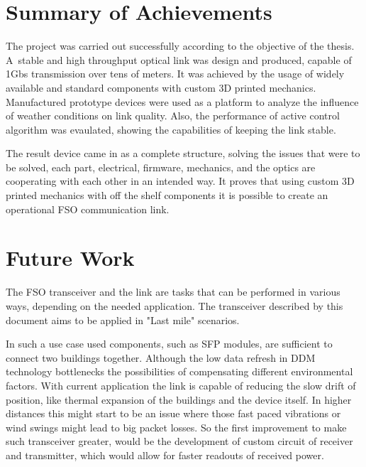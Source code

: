 \documentclass[master,oneside,en,oldtitlepage]{dyplompwr}
\begin{document}
\section{Summary of Achievements}
The project was carried out successfully according to the objective of the thesis. 
A~stable and high throughput optical link was design and produced, capable of 1Gbs transmission over tens of meters.
It was achieved by the usage of widely available and standard components with custom 3D printed mechanics.
Manufactured prototype devices were used as a platform to analyze the influence of weather conditions on link quality.
Also, the performance of active control algorithm was evaulated, showing the capabilities of keeping the link stable.

The result device came in as a complete structure, solving the issues that were to be solved, each part, electrical, firmware, mechanics, and the optics are cooperating with each other in an intended way. It proves that using custom 3D printed mechanics with off the shelf components it is possible to create an operational FSO communication link.

\section{Future Work}

The FSO transceiver and the link are tasks that can be performed in various ways, depending on the needed application.
The transceiver described by this document aims to be applied in "Last mile" scenarios.

In such a use case used components, such as SFP modules, are sufficient to connect two buildings together. 
Although the low data refresh in DDM technology bottlenecks the possibilities of compensating different environmental factors.
With current application the link is capable of reducing the slow drift of position, like thermal expansion of the buildings and the device itself.
In higher distances this might start to be an issue where those fast paced vibrations or wind swings might lead to big packet losses.
So the first improvement to make such transceiver greater, would be the development of custom circuit of receiver and transmitter, which would allow for faster readouts of received power.
\end{document}
